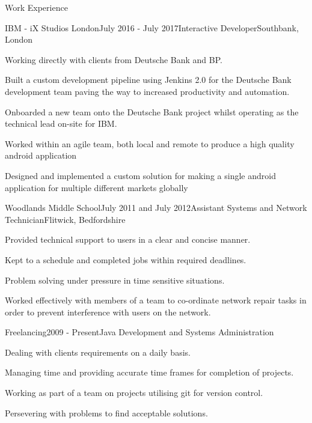 \documentclass{resume} %
\begin{document}
\begin{rSection}{Work Experience}
	
\begin{rSubsection}{IBM - iX Studios London}{July 2016 - July 2017}{Interactive Developer}{Southbank, London}
	\item Working directly with clients from Deutsche Bank and BP.
	\item Built a custom development pipeline using Jenkins 2.0 for the Deutsche Bank development team paving the way to increased productivity and automation.
	\item Onboarded a new team onto the Deutsche Bank project whilst operating as the technical lead on-site for IBM.
	\item Worked within an agile team, both local and remote to produce a high quality android application
	\item Designed and implemented a custom solution for making a single android application for multiple different markets globally
\end{rSubsection}


\begin{rSubsection}{Woodlands Middle School}{July 2011 and July 2012}{Assistant Systems and Network Technician}{Flitwick, Bedfordshire}
	\item Provided technical support to users in a clear and concise manner.
	\item Kept to a schedule and completed jobs within required deadlines.
	\item Problem solving under pressure in time sensitive situations.
	\item Worked effectively with members of a team to co-ordinate network repair tasks in order to prevent interference with users on the network.
\end{rSubsection}


\begin{rSubsection}{Freelancing}{2009 - Present}{Java Development and Systems Administration}{}
\item Dealing with clients requirements on a daily basis.
\item Managing time and providing accurate time frames for completion of projects.
\item Working as part of a team on projects utilising git for version control.
\item Persevering with problems to find acceptable solutions.
\end{rSubsection}


\end{rSection}
\end{document}
